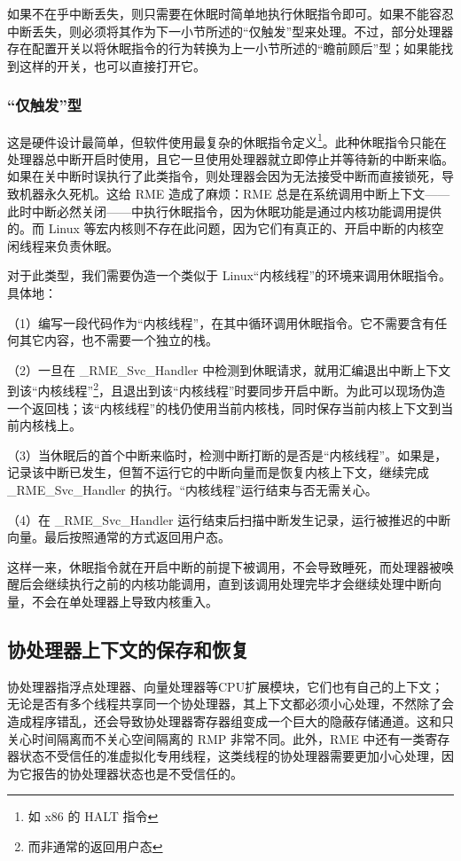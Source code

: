 如果不在乎中断丢失，则只需要在休眠时简单地执行休眠指令即可。如果不能容忍中断丢失，则必须将其作为下一小节所述的``仅触发''型来处理。不过，部分处理器存在配置开关以将休眠指令的行为转换为上一小节所述的``瞻前顾后''型；如果能找到这样的开关，也可以直接打开它。

\subsubsection{``仅触发''型}\label{subsubsec:9-sleep-trigger-only}

这是硬件设计最简单，但软件使用最复杂的休眠指令定义\footnote{如 x86 的 HALT 指令}。此种休眠指令只能在处理器总中断开启时使用，且它一旦使用处理器就立即停止并等待新的中断来临。如果在关中断时误执行了此类指令，则处理器会因为无法接受中断而直接锁死，导致机器永久死机。这给 RME 造成了麻烦：RME 总是在系统调用中断上下文------此时中断必然关闭------中执行休眠指令，因为休眠功能是通过内核功能调用提供的。而 Linux 等宏内核则不存在此问题，因为它们有真正的、开启中断的内核空闲线程来负责休眠。

对于此类型，我们需要伪造一个类似于 Linux``内核线程''的环境来调用休眠指令。具体地：

（1）编写一段代码作为``内核线程''，在其中循环调用休眠指令。它不需要含有任何其它内容，也不需要一个独立的栈。

（2）一旦在 \_RME\_Svc\_Handler 中检测到休眠请求，就用汇编退出中断上下文到该``内核线程''\footnote{而非通常的返回用户态}，且退出到该``内核线程''时要同步开启中断。为此可以现场伪造一个返回栈；该``内核线程''的栈仍使用当前内核栈，同时保存当前内核上下文到当前内核栈上。

（3）当休眠后的首个中断来临时，检测中断打断的是否是``内核线程''。如果是，记录该中断已发生，但暂不运行它的中断向量而是恢复内核上下文，继续完成 \_RME\_Svc\_Handler 的执行。``内核线程''运行结束与否无需关心。

（4）在 \_RME\_Svc\_Handler 运行结束后扫描中断发生记录，运行被推迟的中断向量。最后按照通常的方式返回用户态。

这样一来，休眠指令就在开启中断的前提下被调用，不会导致睡死，而处理器被唤醒后会继续执行之前的内核功能调用，直到该调用处理完毕才会继续处理中断向量，不会在单处理器上导致内核重入。

\subsection{协处理器上下文的保存和恢复}\label{subsec:9-coprocessor-context-switch}

协处理器指浮点处理器、向量处理器等CPU扩展模块，它们也有自己的上下文；无论是否有多个线程共享同一个协处理器，其上下文都必须小心处理，不然除了会造成程序错乱，还会导致协处理器寄存器组变成一个巨大的隐蔽存储通道。这和只关心时间隔离而不关心空间隔离的 RMP 非常不同。此外，RME 中还有一类寄存器状态不受信任的准虚拟化专用线程，这类线程的协处理器需要更加小心处理，因为它报告的协处理器状态也是不受信任的。

